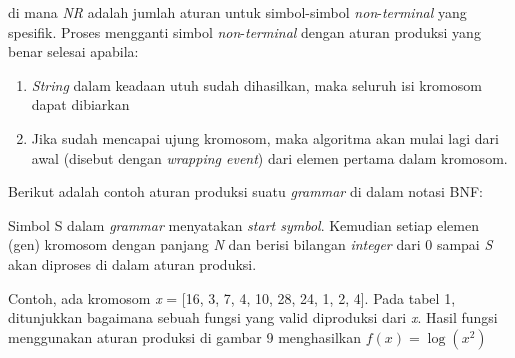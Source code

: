 di mana \textit{NR} adalah jumlah aturan untuk simbol-simbol \textit{non}-\textit{terminal} yang spesifik. Proses mengganti simbol \textit{non}-\textit{terminal } dengan aturan produksi yang benar selesai apabila:

\begin{enumerate}[1.]

	\item  \textit{String} dalam keadaan utuh sudah dihasilkan, maka seluruh isi kromosom dapat dibiarkan
	\item  Jika sudah mencapai ujung kromosom, maka algoritma akan mulai lagi dari awal (disebut dengan \textit{wrapping event}) dari elemen pertama dalam kromosom.

\end{enumerate}

Berikut adalah contoh aturan produksi suatu \textit{grammar} di dalam notasi BNF:



Simbol S dalam \textit{grammar} menyatakan \textit{start symbol}. Kemudian setiap elemen (gen) kromosom dengan panjang \textit{N} dan berisi bilangan \textit{integer} dari 0 sampai \textit{S} akan diproses di dalam aturan produksi. 

Contoh, ada kromosom \textit{x} = [16, 3, 7, 4, 10, 28, 24, 1, 2, 4]. Pada tabel 1, ditunjukkan bagaimana sebuah fungsi yang valid diproduksi dari \textit{x}. Hasil fungsi menggunakan aturan produksi di gambar 9 menghasilkan \begin{math} f(x) =\log (x^{2}) \end{math}

